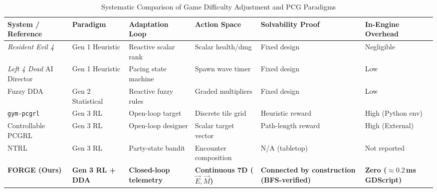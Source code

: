 \begin{table}[!htbp]
\centering
\caption{Systematic Comparison of Game Difficulty Adjustment and PCG Paradigms}
\label{tab:lit_comparison}
\scriptsize
\begin{tabular}{p{}p{}p{}p{}p{}p{}}
\toprule
\textbf{System / Reference} & \textbf{Paradigm} & \textbf{Adaptation Loop} & \textbf{Action Space} & \textbf{Solvability Proof} & \textbf{In-Engine Overhead} \\
\midrule
\textit{Resident Evil 4} & Gen 1 Heuristic & Reactive scalar rank & Scalar health/dmg & Fixed design & Negligible \\
\textit{Left 4 Dead} AI Director~\cite{zohaib2018dynamic} & Gen 1 Heuristic & Pacing state machine & Spawn wave timer & Fixed design & Low \\
Fuzzy DDA~\cite{chrysafiadi2023fuzzy} & Gen 2 Statistical & Reactive fuzzy rules & Graded multipliers & Fixed design & Low \\
\texttt{gym-pcgrl}~\cite{khalifa2020pcgrl} & Gen 3 RL & Open-loop target & Discrete tile grid & Heuristic reward & High (Python env) \\
Controllable PCGRL~\cite{earle2021controllable} & Gen 3 RL & Open-loop designer & Scalar target vector & Path-length reward & High (External) \\
NTRL~\cite{romeo2025ntrl} & Gen 3 RL & Party-state bandit & Encounter composition & N/A (tabletop) & Not reported \\
\textbf{FORGE (Ours)} & \textbf{Gen 3 RL + DDA} & \textbf{Closed-loop telemetry} & \textbf{Continuous 7D ($\vec{E}, \vec{M}$)} & \textbf{Connected by construction (BFS-verified)} & \textbf{Zero ($\approx 0.2$\,ms GDScript)} \\
\bottomrule
\end{tabular}
\end{table}

